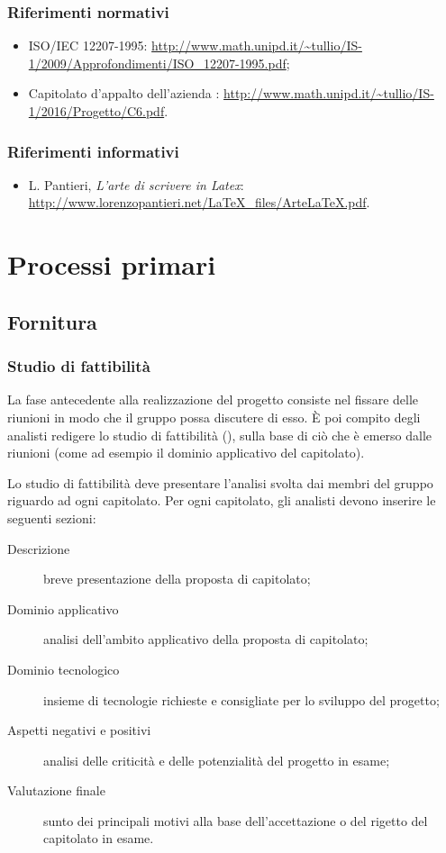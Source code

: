 \subsubsection{Riferimenti normativi}
\begin{itemize}
	\item ISO/IEC 12207-1995: \url{http://www.math.unipd.it/\~tullio/IS-1/2009/Approfondimenti/ISO_12207-1995.pdf};
	\item Capitolato d'appalto dell'azienda \ZU: \url{http://www.math.unipd.it/~tullio/IS-1/2016/Progetto/C6.pdf}. %
\end{itemize}

\subsubsection{Riferimenti informativi}
\begin{itemize}
	\item L. Pantieri, \emph{L'arte di scrivere in Latex}: \url{http://www.lorenzopantieri.net/LaTeX_files/ArteLaTeX.pdf}.
\end{itemize}




\section{Processi primari} \label{sec:primari}

\subsection{Fornitura}

	\subsubsection{Studio di fattibilità}
	La fase antecedente alla realizzazione del progetto consiste nel fissare delle riunioni in modo che il gruppo possa discutere di esso. È poi compito degli analisti redigere lo studio di fattibilità (\SdF), sulla base di ciò che è emerso dalle riunioni (come ad esempio il dominio applicativo del capitolato).

	Lo studio di fattibilità deve presentare l'analisi svolta dai membri del gruppo riguardo ad ogni capitolato. Per ogni capitolato, gli analisti devono inserire le seguenti sezioni:
	\begin{description}
		\item[Descrizione] breve presentazione della proposta di capitolato; 
		\item[Dominio applicativo] analisi dell'ambito applicativo della proposta di capitolato; 
		\item[Dominio tecnologico] insieme di tecnologie richieste e consigliate per lo sviluppo del progetto;
		\item[Aspetti negativi e positivi] analisi delle criticità e delle potenzialità del progetto in esame;
		\item[Valutazione finale] sunto dei principali motivi alla base dell'accettazione o del rigetto del capitolato in esame.
	\end{description}

